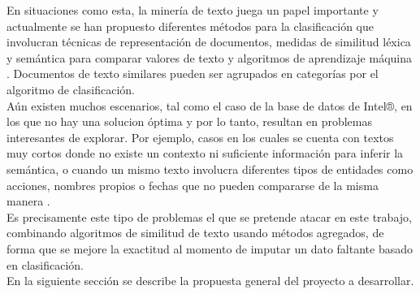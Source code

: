 En situaciones como esta, la minería de texto juega un papel importante y actualmente se han propuesto diferentes métodos para la clasificación que involucran técnicas de representación de documentos, medidas de similitud léxica y semántica para comparar valores de texto y algoritmos de aprendizaje máquina \cite{wang2016non}. Documentos de texto similares pueden ser agrupados en categorías por el algoritmo de clasificación.\\
Aún existen muchos escenarios, tal como el caso de la base de datos de Intel®, en los que no hay una solucion óptima y por lo tanto, resultan en problemas interesantes de explorar. Por ejemplo, casos en los cuales se cuenta con textos muy cortos donde no existe un contexto ni suficiente información para inferir la semántica, o cuando un mismo texto involucra diferentes tipos de entidades como acciones, nombres propios o fechas que no pueden compararse de la misma manera \cite{hoffart2011robust,metzler2007similarity}.\\
Es precisamente este tipo de problemas el que se pretende atacar en este trabajo, combinando algoritmos de similitud de texto usando métodos agregados, de forma que se mejore la exactitud al momento de imputar un dato faltante basado en clasificación.\\
En la siguiente sección se describe la propuesta general del proyecto a desarrollar.



